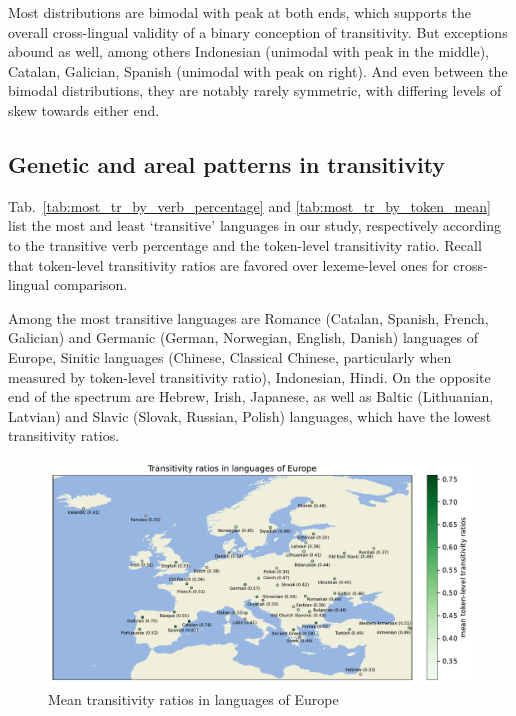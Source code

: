 Most distributions are bimodal with peak at both ends, which supports the overall cross-lingual validity of a binary conception of transitivity. But exceptions abound as well, among others Indonesian (unimodal with peak in the middle), Catalan, Galician, Spanish (unimodal with peak on right). And even between the bimodal distributions, they are notably rarely symmetric, with differing levels of skew towards either end. 

\subsection{Genetic and areal patterns in transitivity}



Tab.~\ref{tab:most_tr_by_verb_percentage} and \ref{tab:most_tr_by_token_mean} list the most and least `transitive' languages in our study, respectively according to the transitive verb percentage and the token-level transitivity ratio. Recall that token-level transitivity ratios are favored over lexeme-level ones for cross-lingual comparison.

Among the most transitive languages are Romance (Catalan, Spanish, French, Galician) and Germanic (German, Norwegian, English, Danish) languages of Europe, Sinitic languages (Chinese, Classical Chinese, particularly when measured by token-level transitivity ratio), Indonesian, Hindi. On the opposite end of the spectrum are Hebrew, Irish, Japanese, as well as Baltic (Lithuanian, Latvian) and Slavic (Slovak, Russian, Polish) languages, which have the lowest transitivity ratios.

\begin{figure}
  \centering
  \includegraphics[width=\textwidth]{figures/transitivity_europe.pdf}
  \caption{Mean transitivity ratios in languages of Europe}
  \label{fig:transitivity_europe}
\end{figure}

